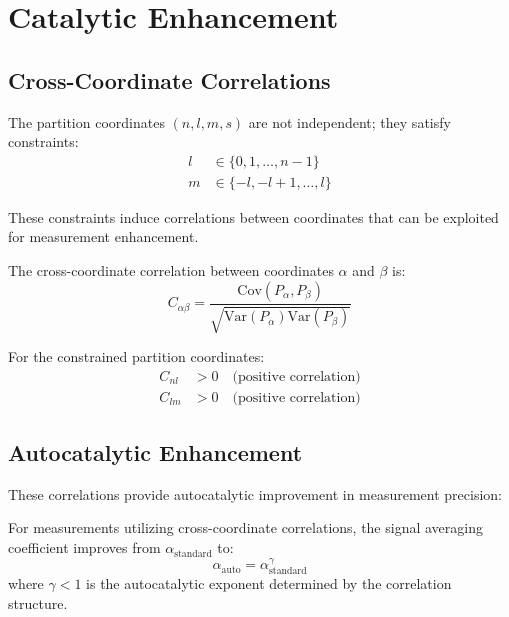 \section{Catalytic Enhancement}
\label{sec:catalysis}

\subsection{Cross-Coordinate Correlations}

The partition coordinates $(n, l, m, s)$ are not independent; they satisfy constraints:
\begin{align}
    l &\in \{0, 1, \ldots, n-1\} \\
    m &\in \{-l, -l+1, \ldots, l\}
\end{align}

These constraints induce correlations between coordinates that can be exploited for measurement enhancement.

\begin{definition}
The cross-coordinate correlation between coordinates $\alpha$ and $\beta$ is:
\begin{equation}
    C_{\alpha\beta} = \frac{\text{Cov}(P_\alpha, P_\beta)}{\sqrt{\text{Var}(P_\alpha) \text{Var}(P_\beta)}}
\end{equation}
\end{definition}

For the constrained partition coordinates:
\begin{align}
    C_{nl} &> 0 \quad \text{(positive correlation)} \\
    C_{lm} &> 0 \quad \text{(positive correlation)}
\end{align}

\subsection{Autocatalytic Enhancement}

These correlations provide autocatalytic improvement in measurement precision:

\begin{theorem}
\label{thm:catalysis}
For measurements utilizing cross-coordinate correlations, the signal averaging coefficient improves from $\alpha_{\text{standard}}$ to:
\begin{equation}
    \alpha_{\text{auto}} = \alpha_{\text{standard}}^{\gamma}
\end{equation}
where $\gamma < 1$ is the autocatalytic exponent determined by the correlation structure.
\end{theorem}

